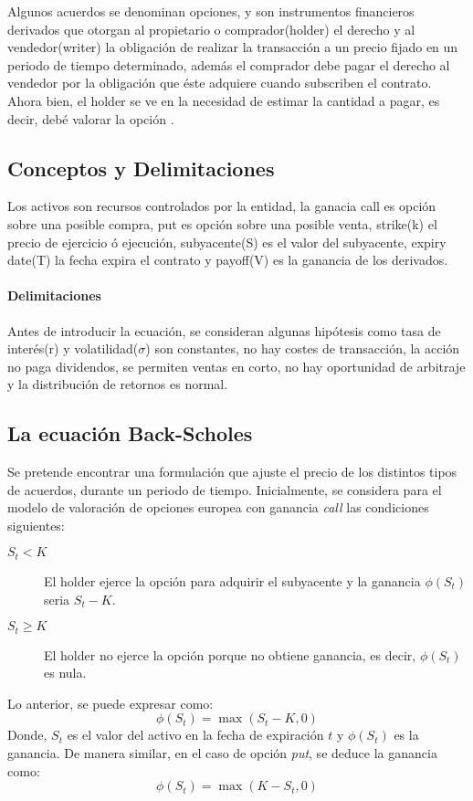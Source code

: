 \documentclass[12pt]{article}
\begin{document}
Algunos acuerdos se denominan opciones, y son instrumentos financieros derivados que otorgan al propietario o comprador(holder) el derecho y al vendedor(writer) la obligación de realizar la transacción a un precio fijado en un periodo de tiempo determinado, además el comprador debe pagar el derecho al vendedor por la obligación que éste adquiere cuando subscriben el contrato. Ahora bien, el holder se ve en la necesidad de estimar la cantidad a pagar, es decir, debé valorar la opción \cite{Art01}. 
\subsection{Conceptos y Delimitaciones}\label{Sec:limitaciones}
Los activos son recursos controlados por la entidad,  la ganacia call es opción sobre una posible compra, put es opción sobre una posible venta, strike(k) el precio de ejercicio ó ejecución, subyacente(S) es el valor del subyacente, expiry date(T) la fecha expira el contrato y payoff(V) es la ganancia de los derivados.   
 
\paragraph{Delimitaciones}
Antes de introducir la ecuación, se consideran algunas hipótesis como tasa de interés(r) y volatilidad($\sigma$) son constantes, no hay costes de transacción, la acción no paga dividendos, se permiten ventas en corto, no hay oportunidad de arbitraje y la distribución de retornos es normal.
\subsection{La ecuación Back-Scholes}
Se pretende encontrar una formulación que ajuste el precio de los distintos tipos de acuerdos, durante un periodo de tiempo. Inicialmente, se considera para el modelo de valoración de opciones europea con ganancia \textit{call} las condiciones siguientes:
\begin{description}
	\item[ $S_t < K$] El holder ejerce la opción para adquirir el subyacente y la ganancia $\phi(S_t)$ seria $S_t-K$. 
	\item[ $S_t \geq K$] El holder no ejerce la opción porque no obtiene ganancia, es decir, $\phi(S_t)$ es nula.
\end{description}  
Lo anterior, se puede expresar como:
\[  \phi(S_t) = \max{(S_t-K,0)}  \]
Donde, $S_t$ es el valor del activo en la fecha de expiración $\textit{t}$ y $\phi(S_t)$ es la ganancia. De manera similar, en el caso de opción \textit{put}, se deduce la ganancia como: 
\[ 
\phi(S_t) = \max{(K-S_t,0)}
\]
\end{document}
